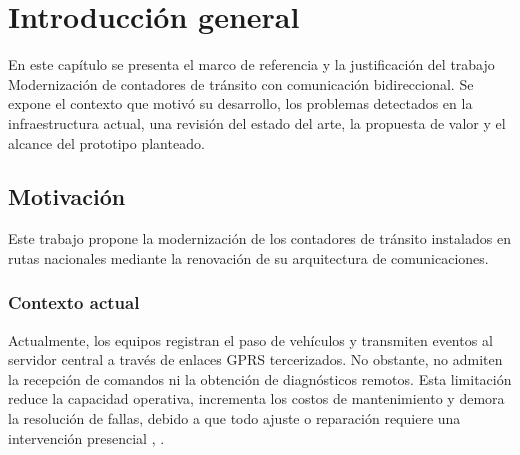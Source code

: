 
\chapter{Introducción general} %

\label{Chapter1} %
\label{IntroGeneral}


\newcommand{\keyword}[1]{\textbf{#1}}
\newcommand{\tabhead}[1]{\textbf{#1}}
\newcommand{\code}[1]{\texttt{#1}}
\newcommand{\file}[1]{\texttt{\bfseries#1}}
\newcommand{\option}[1]{\texttt{\itshape#1}}
\newcommand{\grados}{$^{\circ}$}

En este capítulo se presenta el marco de referencia y la justificación del trabajo Modernización de contadores de tránsito con comunicación bidireccional. Se expone el contexto que motivó su desarrollo, los problemas detectados en la infraestructura actual, una revisión del estado del arte, la propuesta de valor y el alcance del prototipo planteado.





\section{Motivación}

Este trabajo propone la modernización de los contadores de tránsito instalados en rutas nacionales mediante la renovación de su arquitectura de comunicaciones. 
\subsection{Contexto actual}
Actualmente, los equipos registran el paso de vehículos y transmiten eventos al servidor central a través de enlaces GPRS tercerizados. No obstante, no admiten la recepción de comandos ni la obtención de diagnósticos remotos. Esta limitación reduce la capacidad operativa, incrementa los costos de mantenimiento y demora la resolución de fallas, debido a que todo ajuste o reparación requiere una intervención presencial \cite{asiain2021lora} , \cite{micko2023iot}.
